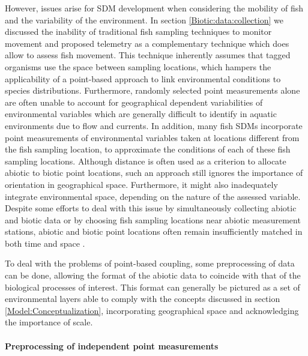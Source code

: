 \documentclass[12pt,authoryear]{elsarticle}
\begin{document}
However, issues arise for SDM development when considering the mobility of fish and the variability of the environment. In section \ref{Biotic:data:collection} we discussed the inability of traditional fish sampling techniques to monitor movement and proposed telemetry as a complementary technique which does allow to assess fish movement. This technique inherently assumes that tagged organisms use the space between sampling locations, which hampers the applicability of a point-based approach to link environmental conditions to species distributions. Furthermore, randomly selected point measurements alone are often unable to account for geographical dependent variabilities of environmental variables which are generally difficult to identify in aquatic environments due to flow and currents. In addition, many fish SDMs incorporate point measurements of environmental variables taken at locations different from the fish sampling location, to approximate the conditions of each of these fish sampling locations. Although distance is often used as a criterion to allocate abiotic to biotic point locations, such an approach still ignores the importance of orientation in geographical space. Furthermore, it might also inadequately integrate environmental space, depending on the nature of the assessed variable. Despite some efforts to deal with this issue by simultaneously collecting abiotic and biotic data \citep{Maes2007} or by choosing fish sampling locations near abiotic measurement stations, abiotic and biotic point locations often remain insufficiently matched in both time and space \citep{Bultel2014,Currey2015,Stein2015}. 

To deal with the problems of point-based coupling, some preprocessing of data can be done, allowing the format of the abiotic data to coincide with that of the biological processes of interest. This format can generally be pictured as a set of environmental layers able to comply with the concepts discussed in section \ref{Model:Conceptualization}, incorporating geographical space and acknowledging the importance of scale.

\paragraph{Preprocessing of independent point measurements}\mbox{}\\
\end{document}
